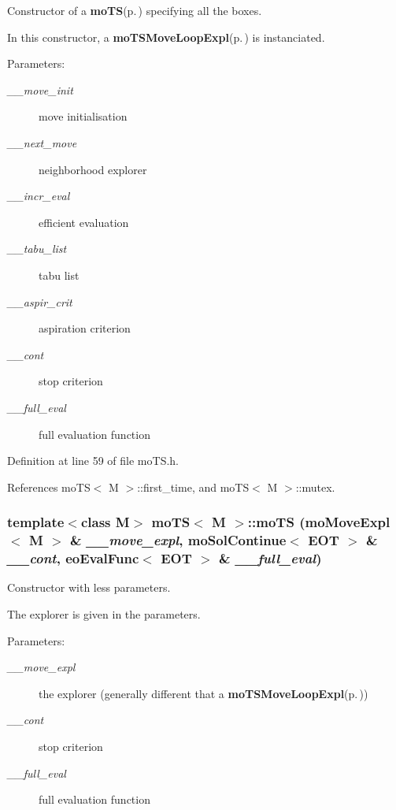 Constructor of a {\bf mo\-TS}{\rm (p.\,\pageref{classmo_t_s})} specifying all the boxes. 

In this constructor, a {\bf mo\-TSMove\-Loop\-Expl}{\rm (p.\,\pageref{classmo_t_s_move_loop_expl})} is instanciated.

\begin{Desc}
\item[Parameters:]
\begin{description}
\item[{\em \_\-\_\-move\_\-init}]move initialisation \item[{\em \_\-\_\-next\_\-move}]neighborhood explorer \item[{\em \_\-\_\-incr\_\-eval}]efficient evaluation \item[{\em \_\-\_\-tabu\_\-list}]tabu list \item[{\em \_\-\_\-aspir\_\-crit}]aspiration criterion \item[{\em \_\-\_\-cont}]stop criterion \item[{\em \_\-\_\-full\_\-eval}]full evaluation function \end{description}
\end{Desc}


Definition at line 59 of file mo\-TS.h.

References mo\-TS$<$ M $>$::first\_\-time, and mo\-TS$<$ M $>$::mutex.
\subsubsection{\setlength{\rightskip}{0pt plus 5cm}template$<$class M$>$ {\bf mo\-TS}$<$ M $>$::{\bf mo\-TS} ({\bf mo\-Move\-Expl}$<$ M $>$ \& {\em \_\-\_\-move\_\-expl}, {\bf mo\-Sol\-Continue}$<$ {\bf EOT} $>$ \& {\em \_\-\_\-cont}, eo\-Eval\-Func$<$ {\bf EOT} $>$ \& {\em \_\-\_\-full\_\-eval})\hspace{0.3cm}{\tt  [inline]}}\label{classmo_t_s_508e675c4232cf2ca06dded931c90bab}


Constructor with less parameters. 

The explorer is given in the parameters.

\begin{Desc}
\item[Parameters:]
\begin{description}
\item[{\em \_\-\_\-move\_\-expl}]the explorer (generally different that a {\bf mo\-TSMove\-Loop\-Expl}{\rm (p.\,\pageref{classmo_t_s_move_loop_expl})}) \item[{\em \_\-\_\-cont}]stop criterion \item[{\em \_\-\_\-full\_\-eval}]full evaluation function \end{description}
\end{Desc}


